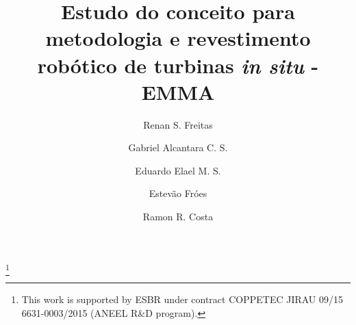 \documentclass{main}
\begin{document}
\begin{frontmatter}

\title{Estudo do conceito para metodologia e revestimento robótico
de turbinas \textit{in situ} - EMMA
} 

\thanks[footnoteinfo]{This work is supported by ESBR under contract COPPETEC
JIRAU 09/15 6631-0003/2015 (ANEEL R\&D program).}

\author[1]{Renan S. Freitas}
\author[1]{Gabriel Alcantara C. S.}
\author[1]{Eduardo Elael M. S.}
\author[1]{Estevão Fróes}
\author[1]{Ramon R. Costa}

  \address[1]{Departamento de Engenharia Elétrica, COPPE UFRJ, Rio de Janeiro,
  Brasil} 
  
\begin{abstract}                %
\end{abstract} 
 
\begin{keyword}
\end{keyword}

\end{frontmatter}


%
 


%
  
 
\appendix
\end{document}
